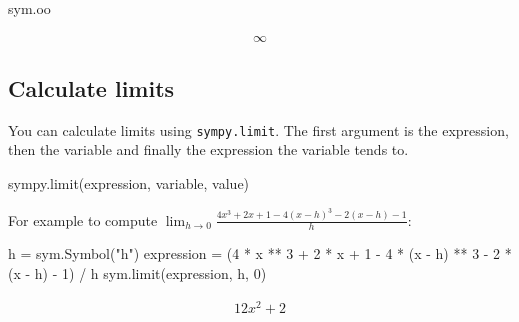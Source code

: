 \begin{pyin}
sym.oo
\end{pyin}




\begin{equation*}
\begin{split}\displaystyle \infty\end{split}
\end{equation*}




\subsection{Calculate limits}
\label{\detokenize{tools-for-mathematics/03-calculus/how/main:calculate-limits}}

You can calculate limits using \texttt{sympy.limit}. The first argument is the
expression, then the variable and finally the expression the variable tends to.


\begin{api}
sympy.limit(expression, variable, value)
\end{api}



For example to compute \(\lim_{h \to 0} \frac{4 x ^ 3 + 2 x + 1 - 4(x - h)^3 - 2(x - h) - 1}{h}\):




\begin{pyin}
h = sym.Symbol("h")
expression = (4 * x ** 3 + 2 * x + 1 - 4 * (x - h) ** 3 - 2 * (x - h) - 1) / h
sym.limit(expression, h, 0)
\end{pyin}




\begin{equation*}
\begin{split}\displaystyle 12 x^{2} + 2\end{split}
\end{equation*}






